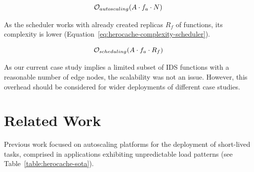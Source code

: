 \begin{equation}
\setlength{\abovedisplayskip}{0pt}
\setlength{\belowdisplayskip}{0pt}
   \footnotesize \mathcal{O}_{autoscaling}(A \cdot f_{a} \cdot N)
\label{eq:herocache-complexity-autoscaler}
\end{equation}

As the scheduler works with already created replicas $R_{f}$ of functions, its complexity is lower (Equation~\ref{eq:herocache-complexity-scheduler}).

\begin{equation}
\setlength{\abovedisplayskip}{0pt}
\setlength{\belowdisplayskip}{0pt}
  \footnotesize  \mathcal{O}_{scheduling}(A \cdot f_{a} \cdot R_{f})
\label{eq:herocache-complexity-scheduler}
\end{equation}

As our current case study implies a limited subset of IDS functions with a reasonable number of edge nodes, the scalability was not an issue. However, this overhead should be considered for wider deployments of different case studies.

\section{Related Work}
\label{section:herocache-sota}

Previous work focused on autoscaling platforms for the deployment of short-lived tasks, comprised in applications exhibiting unpredictable load patterns (see Table~\ref{table:herocache-sota}).%

